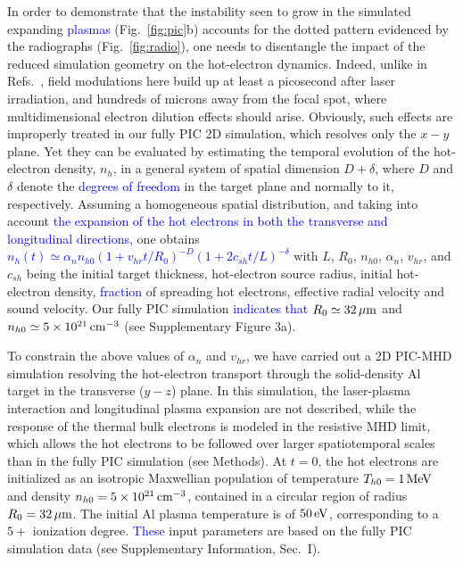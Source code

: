 \documentclass[aps,showpacs,superscriptaddress]{revtex4}
\begin{document}
In order to demonstrate that the instability seen to grow in the simulated expanding \textcolor{blue}{plasmas} (Fig.~\ref{fig:pic}b) accounts for the dotted pattern evidenced by the radiographs (Fig.~\ref{fig:radio}), one needs to disentangle the impact of the reduced simulation geometry on the hot-electron dynamics. Indeed, unlike in Refs.~\cite{PRL_Gode_2017, NJP_Scott_2017}, field modulations here build up at least a picosecond after laser irradiation, and hundreds of microns away from the focal spot, where multidimensional electron dilution effects should arise. Obviously, such effects are improperly treated in our fully PIC 2D simulation, which resolves only the $x-y$ plane. Yet they can be evaluated by estimating the temporal evolution of the hot-electron density, $n_h$, in a general system of spatial dimension $D+\delta$, where $D$ and $\delta$ denote the \textcolor{blue}{degrees of freedom} in the target plane and normally to it, respectively. Assuming a homogeneous spatial distribution, and taking into account \textcolor{blue}{the expansion of the hot electrons in both the transverse and longitudinal directions},
one obtains \textcolor{blue}{$n_h(t) \simeq \alpha_n n_{h0}(1+ v_{hr} t /R_0)^{-D}(1+ 2c_{sh} t/L)^{-\delta}$} with $L$, $R_0$, $n_{h0}$, $\alpha_n$, $v_{hr}$, and $c_{sh}$ being the initial target thickness, hot-electron source radius, initial hot-electron density, \textcolor{blue}{fraction} of spreading hot electrons, effective radial velocity and sound velocity. Our fully PIC simulation \textcolor{blue}{indicates that} $R_0 \simeq 32\,\rm \mu m$ and $n_{h0} \simeq 5\times 10^{21}\,\rm cm^{-3}$ (see Supplementary Figure 3a).

To constrain the above values of $\alpha_n$ and $v_{hr}$, we have carried out a 2D PIC-MHD simulation resolving the hot-electron transport through the solid-density Al target in the transverse ($y-z$) plane. In this simulation, the laser-plasma interaction and longitudinal plasma expansion are not described, while the response of the thermal bulk electrons is modeled in the resistive MHD limit, which allows the hot electrons to be followed over larger spatiotemporal scales than in the fully PIC simulation (see Methods). At $t=0$, the hot electrons are initialized as an isotropic Maxwellian population of temperature $T_{h0}=1\,\rm MeV$ and density $n_{h0}=5\times10^{21}\,\rm cm^{-3}$, contained in a circular region of radius $R_0=32\,\rm \mu m$. The initial Al plasma temperature is of $50\,\rm eV$, corresponding to a $5+$ ionization degree. \textcolor{blue}{These} input parameters are based on the fully PIC simulation data (see Supplementary Information, Sec.~I).
\end{document}

